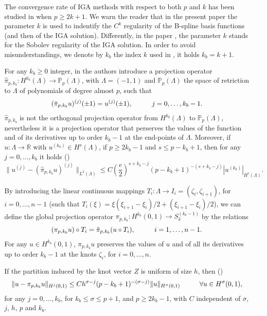 \documentclass[11pt]{article}
\begin{document}
The convergence rate  of IGA methods with respect to both $p$ and $k$ has been 
studied in \cite{bbrs} when $p\geq 2k+1$. We warn the reader that 
in the present paper the parameter $k$ is used
to indentify the $C^k$ regularity of the B-spline basis 
functions (and then of the IGA solution).
Differently, in the paper \cite{bbrs}, the parameter $k$ stands 
for the Sobolev 
regularity of the IGA solution. In order to avoid misunderstandings, we 
denote by $k_b$ the index $k$ used in \cite{bbrs}, it holds $k_b=k+1$.

For any $k_b\geq 0$ integer, in \cite{bbrs}
the authors introduce a projection operator 
$\hat \pi_{p,k_b}:H^{k_b}(\Lambda)\to {\mathbb P}_p(\Lambda)$, 
with $\Lambda=(-1,1)$  and
${\mathbb P}_p(\Lambda)$ the space of retriction to $\Lambda$ of
polynomials of degree almost $p$, such that
\begin{equation}
(\hat \pi_{p,k_b}u)^{(j)}(\pm 1)=u^{(j)}(\pm 1), \hskip 1.cm j=0,\ldots,
k_b-1.
\end{equation}
$\hat \pi_{p,k_b}$ is not the orthogonal projection operator from 
$H^{k_b}(\Lambda)$ to ${\mathbb P}_p(\Lambda)$,
nevertheless it is a projection operator that perserves the values
of the function and of its derivatives up to order $k_b-1$ at the end-points
of $\Lambda$. Moreover,  if $u:\Lambda\to {\mathbb R}$ with
$u^{(k_b)}\in H^s(\Lambda)$, if $p\geq 2k_b-1$ and $s\leq p-k_b+1$, then 
for any $j=0,\ldots,k_b$ it holds (\cite[Cor. 2]{bbrs})
\begin{equation}\label{stima_pikp_local}
\|u^{(j)}-(\hat\pi_{p,k_b}u)^{(j)}\|_{L^2(\Lambda)}\leq C 
\left(\frac{e}{2}\right)^{s+k_b-j}
(p-k_b+1)^{-(s+k_b-j)}|u^{(k_b)}|_{H^s(\Lambda)}.
\end{equation}

By introducing the linear continuous mappings 
$T_i:\Lambda\to I_i=(\zeta_i, \zeta_{i+1})$, for $i=0,\ldots,n-1$ 
(such that $T_i(\xi)=\xi(\xi_{i+1}-\xi_i)/2+(\xi_{i+1}-\xi_i)/2$),
we can define the global projection operator
$\pi_{p,k_b}:H^{k_b}(0,1)\to S_\delta^{(k_b-1)}$ by the relations
\begin{equation}
(\pi_{p,k_b} u)\circ T_i=\hat \pi_{p,k_b} (u\circ T_i),\hskip 1.cm i=1,\ldots,n-1.
\end{equation}
For any $u\in H^{k_b}(0,1)$,  $\pi_{p,k_b}u$ preserves the values of $u$
and of all its derivatives up to order $k_b-1$ at the knots
$\zeta_i$, for $i=0,\ldots,n$.

If the partition induced by the knot 
vector $Z$ is uniform of size $h$, then (\cite[Thm. 2]{bbrs}) 
\begin{equation}\label{stima_pikp}
\|u-\pi_{p,k_b}u\|_{H^j(0,1)}\leq C h^{\sigma-j}(p-k_b+1)^{-(\sigma-j)}\|u\|_{H^\sigma(0,1)}\hskip 1.cm \forall u \in H^\sigma(0,1),
\end{equation}
for any $j=0,\ldots,k_b$, for $k_b\leq \sigma\leq p+1$, 
and $p\geq 2k_b-1$,  with
$C$ independent of $\sigma$, $j$, $h$, $p$ and $k_b$.
\end{document}
